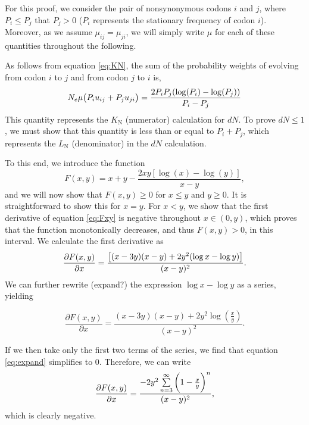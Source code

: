 \documentclass{pnastwo}
\begin{document}
\begin{article}
For this proof, we consider the pair of nonsynonymous codons $i$ and $j$, where $P_i \leq P_j$ that $P_j > 0$ ($P_i$ represents the stationary frequency of codon $i$). Moreover, as we assume $\mu_{ij} = \mu_{ji}$, we will simply write $\mu$ for each of these quantities throughout the following.

As follows from equation \eqref{eq:KN}, the sum of the probability weights of evolving from codon $i$ to $j$ and from codon $j$ to $i$ is,
\begin{equation}
N_e\mu \big{(} P_iu_{ij} + P_ju_{ji} \big{)} = \frac{2P_iP_j(\log(P_i) - \log(P_j))}{P_i - P_j}
\end{equation}
This quantity represents the $K_\text{N}$ (numerator) calculation for $dN$. To prove $dN \leq 1$, we must show that this quantity is less than or equal to $P_i + P_j$, which represents the $L_\text{N}$ (denominator) in the $dN$ calculation.

To this end, we introduce the function 
\begin{equation}\label{eq:Fxy}
F(x,y) = x + y - \frac{2xy[\log(x) - \log(y)]}{x - y} ,
\end{equation}
and we will now show that $F(x,y) \geq 0$ for $x \leq y$ and $y \geq 0 $. It is straightforward to show this for $x=y$. For $x < y$, we show that the first derivative of equation \eqref{eq:Fxy} is negative throughout $x \in (0,y)$, which proves that the function monotonically decreases, and thus $F(x,y) > 0$, in this interval. We calculate the first derivative as 
\begin{equation}
\frac{\partial{F(x,y)}}{\partial{x}} = \frac{\big{[} (x-3y)(x-y)+ 2y^2(\log{x} - \log{y}) \big{]}}{(x-y)^2} .
\end{equation}
We can further rewrite (expand?) the expression $\log{x} - \log{y}$ as a series, yielding

\begin{equation}\label{eq:expand}
\frac{\partial{F(x,y)}}{\partial{x}} = \frac{(x-3y)(x-y) + 2y^2\log(\frac{x}{y})} {(x-y)^2} .
\end{equation}

If we then take only the first two terms of the series, we find that equation \eqref{eq:expand} simplifies to 0. Therefore, we can write
\begin{equation}
\frac{\partial{F(x,y)}}{\partial{x}} = \frac{-2y^2\sum\limits_{n=3}^\infty \bigg{(}1-\frac{x}{y}\bigg{)}^n}{(x-y)^2} ,
\end{equation}
which is clearly negative. 



\end{article}
\end{document}
